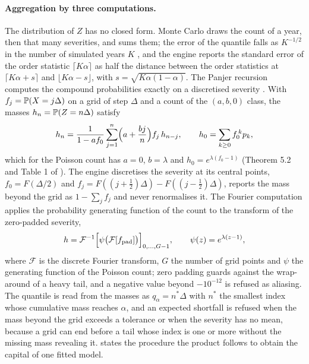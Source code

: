 \paragraph{Aggregation by three computations.} The distribution of $Z$ has no closed form. Monte Carlo draws the count of a year,
then that many severities, and sums them; the error of the quantile falls as $K^{-1/2}$ in the number of simulated years $K$
\citep{oprisk:shevchenko2010}, and the engine reports the standard error of the order statistic $\lceil K\alpha\rceil$ as half the
distance between the order statistics at $\lceil K\alpha+s\rceil$ and $\lfloor K\alpha-s\rfloor$, with
$s=\sqrt{K\alpha(1-\alpha)}$. The Panjer recursion computes the compound probabilities exactly on a discretised severity
\citep{oprisk:panjer1981}. With $f_j=\mathbb{P}(X=j\Delta)$ on a grid of step $\Delta$ and a count of the $(a,b,0)$ class, the masses
$h_n=\mathbb{P}(Z=n\Delta)$ satisfy
\begin{equation}
h_n=\frac{1}{1-af_0}\sum_{j=1}^{n}\Bigl(a+\frac{bj}{n}\Bigr)f_j\,h_{n-j},\qquad h_0=\sum_{k\ge0}f_0^{\,k}p_k,
\label{eq:op-panjer}
\end{equation}
which for the Poisson count has $a=0$, $b=\lambda$ and $h_0=e^{\lambda(f_0-1)}$ (Theorem 5.2 and Table 1 of
\citealp{oprisk:shevchenko2010}). The engine discretises the severity at its central points, $f_0=F(\Delta/2)$ and
$f_j=F((j+\tfrac12)\Delta)-F((j-\tfrac12)\Delta)$, reports the mass beyond the grid as $1-\sum_j f_j$ and never renormalises it. The
Fourier computation applies the probability generating function of the count to the transform of the zero-padded severity,
\begin{equation}
h=\mathcal{F}^{-1}\Bigl[\psi\bigl(\mathcal{F}[f_{\mathrm{pad}}]\bigr)\Bigr]_{0,\dots,G-1},\qquad \psi(z)=e^{\lambda(z-1)},
\label{eq:op-fft}
\end{equation}
where $\mathcal{F}$ is the discrete Fourier transform, $G$ the number of grid points and $\psi$ the generating function of the
Poisson count; zero padding guards against the wrap-around of a heavy tail, and a negative value beyond $-10^{-12}$ is refused as
aliasing. The quantile is read from the masses as $q_\alpha=n^\ast\Delta$ with $n^\ast$ the smallest index whose cumulative mass reaches
$\alpha$, and an expected shortfall is refused when the mass beyond the grid exceeds a tolerance or when the severity has no
mean, because a grid can end before a tail whose index is one or more without the missing mass revealing it. 
states the procedure the product follows to obtain the capital of one fitted model.

